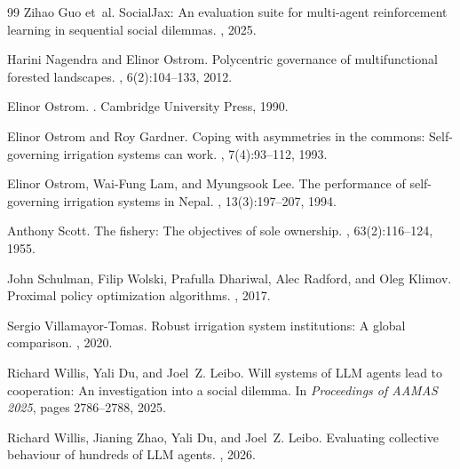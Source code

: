 \documentclass[10pt]{article}
\begin{document}
\begin{thebibliography}{99}
Zihao Guo et~al.
\newblock SocialJax: An evaluation suite for multi-agent reinforcement learning in sequential social dilemmas.
, 2025.

Harini Nagendra and Elinor Ostrom.
\newblock Polycentric governance of multifunctional forested landscapes.
, 6(2):104--133, 2012.

Elinor Ostrom.
.
\newblock Cambridge University Press, 1990.

Elinor Ostrom and Roy Gardner.
\newblock Coping with asymmetries in the commons: Self-governing irrigation systems can work.
, 7(4):93--112, 1993.

Elinor Ostrom, Wai-Fung Lam, and Myungsook Lee.
\newblock The performance of self-governing irrigation systems in Nepal.
, 13(3):197--207, 1994.

Anthony Scott.
\newblock The fishery: The objectives of sole ownership.
, 63(2):116--124, 1955.

John Schulman, Filip Wolski, Prafulla Dhariwal, Alec Radford, and Oleg Klimov.
\newblock Proximal policy optimization algorithms.
, 2017.

Sergio Villamayor-Tomas.
\newblock Robust irrigation system institutions: A global comparison.
, 2020.

Richard Willis, Yali Du, and Joel~Z. Leibo.
\newblock Will systems of {LLM} agents lead to cooperation: An investigation into a social dilemma.
\newblock In {\em Proceedings of AAMAS 2025}, pages 2786--2788, 2025.

Richard Willis, Jianing Zhao, Yali Du, and Joel~Z. Leibo.
\newblock Evaluating collective behaviour of hundreds of {LLM} agents.
, 2026.

\end{thebibliography}
\normalsize
\end{document}
